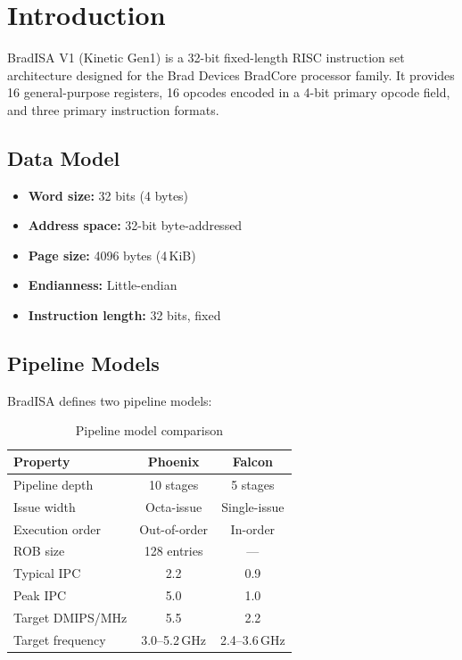 \documentclass[11pt,a4paper]{article}
\begin{document}
\newpage

\tableofcontents
\newpage

\section{Introduction}

BradISA V1 (Kinetic Gen1) is a 32-bit fixed-length RISC instruction set architecture
designed for the Brad Devices BradCore processor family. It provides 16 general-purpose
registers, 16 opcodes encoded in a 4-bit primary opcode field, and three primary
instruction formats.

\subsection{Data Model}
\begin{itemize}[nosep]
  \item \textbf{Word size:} 32 bits (4 bytes)
  \item \textbf{Address space:} 32-bit byte-addressed
  \item \textbf{Page size:} 4096 bytes (4\,KiB)
  \item \textbf{Endianness:} Little-endian
  \item \textbf{Instruction length:} 32 bits, fixed
\end{itemize}

\subsection{Pipeline Models}
BradISA defines two pipeline models:

\begin{table}[H]
\centering
\caption{Pipeline model comparison}
\begin{tabular}{lcc}
\toprule
Property               & Phoenix            & Falcon           \\
\midrule
Pipeline depth         & 10 stages          & 5 stages         \\
Issue width            & Octa-issue         & Single-issue     \\
Execution order        & Out-of-order       & In-order         \\
ROB size              & 128 entries         & ---              \\
Typical IPC           & 2.2                & 0.9              \\
Peak IPC              & 5.0                & 1.0              \\
Target DMIPS/MHz      & 5.5                & 2.2              \\
Target frequency      & 3.0--5.2\,GHz      & 2.4--3.6\,GHz    \\
\bottomrule
\end{tabular}
\end{table}
\end{document}
